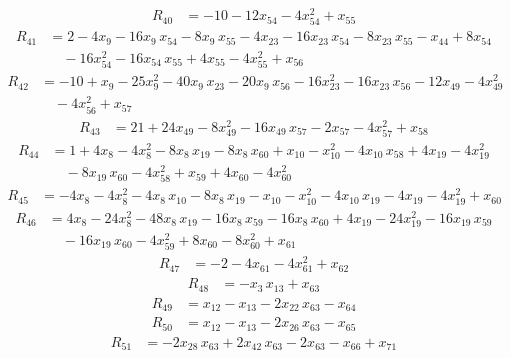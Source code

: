 \begin{align*}
R_{40} &= -10 -12x_{54} -4x_{54}^{2} +x_{55}
\end{align*}
\begin{align*}
R_{41} &= 2 -4x_{9} -16x_{9}\,x_{54} -8x_{9}\,x_{55} -4x_{23} -16x_{23}\,x_{54} -8x_{23}\,x_{55} -x_{44} +8x_{54} \\
&\quad {} -16x_{54}^{2} -16x_{54}\,x_{55} +4x_{55} -4x_{55}^{2} +x_{56}
\end{align*}
\begin{align*}
R_{42} &= -10 +x_{9} -25x_{9}^{2} -40x_{9}\,x_{23} -20x_{9}\,x_{56} -16x_{23}^{2} -16x_{23}\,x_{56} -12x_{49} -4x_{49}^{2} \\
&\quad {} -4x_{56}^{2} +x_{57}
\end{align*}
\begin{align*}
R_{43} &= 21 +24x_{49} -8x_{49}^{2} -16x_{49}\,x_{57} -2x_{57} -4x_{57}^{2} +x_{58}
\end{align*}
\begin{align*}
R_{44} &= 1 +4x_{8} -4x_{8}^{2} -8x_{8}\,x_{19} -8x_{8}\,x_{60} +x_{10} -x_{10}^{2} -4x_{10}\,x_{58} +4x_{19} -4x_{19}^{2} \\
&\quad {} -8x_{19}\,x_{60} -4x_{58}^{2} +x_{59} +4x_{60} -4x_{60}^{2}
\end{align*}
\begin{align*}
R_{45} &= -4x_{8} -4x_{8}^{2} -4x_{8}\,x_{10} -8x_{8}\,x_{19} -x_{10} -x_{10}^{2} -4x_{10}\,x_{19} -4x_{19} -4x_{19}^{2} +x_{60}
\end{align*}
\begin{align*}
R_{46} &= 4x_{8} -24x_{8}^{2} -48x_{8}\,x_{19} -16x_{8}\,x_{59} -16x_{8}\,x_{60} +4x_{19} -24x_{19}^{2} -16x_{19}\,x_{59} \\
&\quad {} -16x_{19}\,x_{60} -4x_{59}^{2} +8x_{60} -8x_{60}^{2} +x_{61}
\end{align*}
\begin{align*}
R_{47} &= -2 -4x_{61} -4x_{61}^{2} +x_{62}
\end{align*}
\begin{align*}
R_{48} &= -x_{3}\,x_{13} +x_{63}
\end{align*}
\begin{align*}
R_{49} &= x_{12} -x_{13} -2x_{22}\,x_{63} -x_{64}
\end{align*}
\begin{align*}
R_{50} &= x_{12} -x_{13} -2x_{26}\,x_{63} -x_{65}
\end{align*}
\begin{align*}
R_{51} &= -2x_{28}\,x_{63} +2x_{42}\,x_{63} -2x_{63} -x_{66} +x_{71}
\end{align*}
